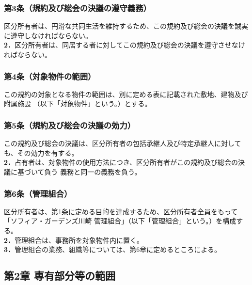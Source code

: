 \documentclass[
  luatex,
  paper=a4paper,
  fontsize=11pt,
  jafontsize=11pt,
  jlreq_notes,
]{jlreq}
\begin{document}
  \subsubsection*{ 第3条（規約及び総会の決議の遵守義務）}
  区分所有者は、円滑な共同生活を維持するため、この規約及び総会の決議を誠実に遵守しなければならない。\\
  \textbf{2．}区分所有者は、同居する者に対してこの規約及び総会の決議を遵守させなければならない。

  \subsubsection*{ 第4条（対象物件の範囲）}
  この規約の対象となる物件の範囲は、別に定める表に記載された敷地、建物及び附属施設
  （以下「対象物件」という。）とする。

  \subsubsection*{ 第5条（規約及び総会の決議の効力）}
  この規約及び総会の決議は、区分所有者の包括承継人及び特定承継人に対しても、その効力を有する。\\
  \textbf{2．}占有者は、対象物件の使用方法につき、区分所有者がこの規約及び総会の決議に基づいて負う
  義務と同一の義務を負う。

  \subsubsection*{ 第6条（管理組合）}
  区分所有者は、第1条に定める目的を達成するため、区分所有者全員をもって「ソフィア・ガーデンズ川崎
  管理組合」（以下「管理組合」という。）を構成する。\\
  \textbf{2．}管理組合は、事務所を対象物件内に置く。\\
  \textbf{3．}管理組合の業務、組織等については、第6章に定めるところによる。\\
  
  \begin{center}
    \subsection*{第2章 専有部分等の範囲}
  \end{center}
\end{document}
